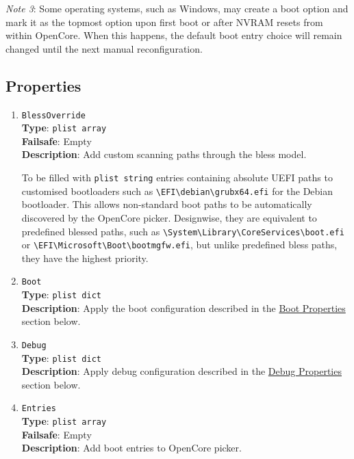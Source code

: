 \documentclass[]{article}
\begin{document}
\emph{Note 3}: Some operating systems, such as Windows, may create a boot option and mark it as
the topmost option upon first boot or after NVRAM resets from within OpenCore. When this happens,
the default boot entry choice will remain changed until the next manual reconfiguration.

\subsection{Properties}\label{miscprops}

\begin{enumerate}

\item
  \texttt{BlessOverride}\\
  \textbf{Type}: \texttt{plist\ array}\\
  \textbf{Failsafe}: Empty\\
  \textbf{Description}: Add custom scanning paths through the bless model.

  To be filled with \texttt{plist\ string} entries containing
  absolute UEFI paths to customised bootloaders such as
  \texttt{\textbackslash EFI\textbackslash debian\textbackslash grubx64.efi}
  for the Debian bootloader. This allows non-standard boot paths to be automatically
  discovered by the OpenCore picker. Designwise, they are equivalent to predefined blessed paths, such as
  \texttt{\textbackslash System\textbackslash Library\textbackslash CoreServices\textbackslash boot.efi}
  or \texttt{\textbackslash EFI\textbackslash Microsoft\textbackslash Boot\textbackslash bootmgfw.efi},
  but unlike predefined bless paths, they have the highest priority.

\item
  \texttt{Boot}\\
  \textbf{Type}: \texttt{plist\ dict}\\
  \textbf{Description}: Apply the boot configuration described in the
  \hyperref[miscbootprops]{Boot Properties} section below.

\item
  \texttt{Debug}\\
  \textbf{Type}: \texttt{plist\ dict}\\
  \textbf{Description}: Apply debug configuration described in the
  \hyperref[miscdebugprops]{Debug Properties} section below.

\item
  \texttt{Entries}\\
  \textbf{Type}: \texttt{plist\ array}\\
  \textbf{Failsafe}: Empty\\
  \textbf{Description}: Add boot entries to OpenCore picker.


\end{enumerate}
\end{document}
